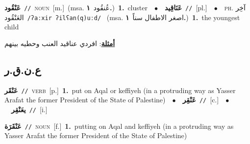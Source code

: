 \documentclass[10pt,a4paper,twoside]{article} %
\begin{document}
\begin{multicols}{2}
{\setlength\topsep{0pt}\textbf{\foreignlanguage{arabic}{عَنْقُود}}\ {\color{gray}\texttt{//}\color{black}}\ \textsc{noun}\ [m.]\ \color{gray}(msa. \foreignlanguage{arabic}{عُنقُود}~\foreignlanguage{arabic}{\textbf{١.}})\color{black}\ \textbf{1.}~cluster\ \ $\bullet$\ \ \setlength\topsep{0pt}\textbf{\foreignlanguage{arabic}{عَنَاقِيد}}\ {\color{gray}\texttt{//}\color{black}}\ [pl.]\ \ $\bullet$\ \ \textsc{ph.} \color{gray} \foreignlanguage{arabic}{آخِر العَنْقُود}\color{black}\ {\color{gray}\texttt{/{\sffamily ʔaːxir ʔilʕan(q)uːd}/}\color{black}}\ \color{gray} (msa. \foreignlanguage{arabic}{اصغر الاطفال سناً}~\foreignlanguage{arabic}{\textbf{١.}})\color{black}\ \textbf{1.}~the youngest child\  \begin{flushright}\color{gray}\foreignlanguage{arabic}{\textbf{\underline{\foreignlanguage{arabic}{أمثلة}}}: افردي عناقيد العنب وحطيه بينهم}\end{flushright}\color{black}} \vspace{2mm}

\vspace{-3mm}
\subsection*{\color{blue}\foreignlanguage{arabic}{ع.ن.ق.ر}\color{blue}{}} 

{\setlength\topsep{0pt}\textbf{\foreignlanguage{arabic}{عَنْقَر}}\ {\color{gray}\texttt{//}\color{black}}\ \textsc{verb}\ [p.]\ \textbf{1.}~put on Aqal or keffiyeh  (in a protruding way as Yasser Arafat the former President of the State of Palestine)\ \ $\bullet$\ \ \setlength\topsep{0pt}\textbf{\foreignlanguage{arabic}{عَنْقِر}}\ {\color{gray}\texttt{//}\color{black}}\ [c.]\ \ $\bullet$\ \ \setlength\topsep{0pt}\textbf{\foreignlanguage{arabic}{يعَنْقِر}}\ {\color{gray}\texttt{//}\color{black}}\ [i.]\ } \vspace{2mm}

{\setlength\topsep{0pt}\textbf{\foreignlanguage{arabic}{عَنْقَرَة}}\ {\color{gray}\texttt{//}\color{black}}\ \textsc{noun}\ [f.]\ \textbf{1.}~putting on Aqal and keffiyeh (in a protruding way as Yasser Arafat the former President of the State of Palestine)\ } \vspace{2mm}


\end{multicols}
\end{document}
